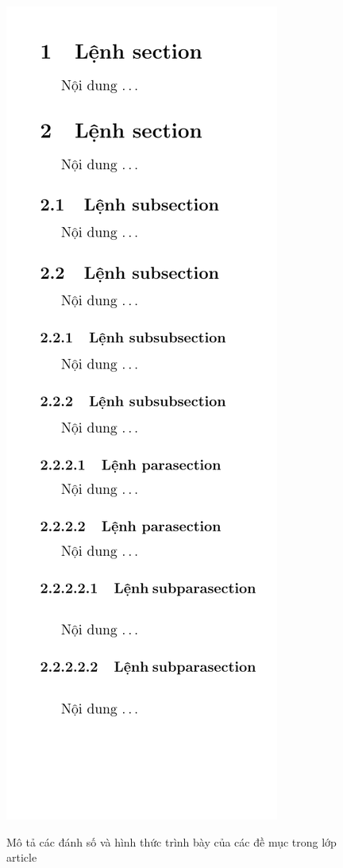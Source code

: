 \documentclass[12pt,a4paper]{article}
\begin{document}
\begin{itemize}
\begin{itemize}
\begin{figure}[h]
\begin{center}
{							\includegraphics[scale=.8]{section-subparagraph-article-4}
						}
					\end{center}
					\caption{Mô tả các đánh số và hình thức trình bày của các đề mục trong lớp article}\label{Ex:danhso-noidung-2}
					\vspace{-1cm}
				\end{figure}
			\end{itemize}
	\end{itemize}
\end{document}
